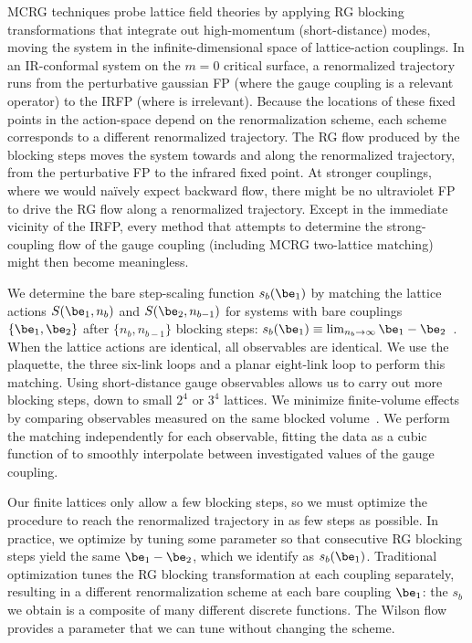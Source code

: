 
MCRG techniques probe lattice field theories by applying RG blocking transformations that integrate out high-momentum (short-distance) modes, moving the system in the infinite-dimensional space of lattice-action couplings.
In an IR-conformal system on the $m = 0$ critical surface, a renormalized trajectory runs from the perturbative gaussian FP (where the gauge coupling \be is a relevant operator) to the IRFP (where \be is irrelevant).
Because the locations of these fixed points in the action-space depend on the renormalization scheme, each scheme corresponds to a different renormalized trajectory.
The RG flow produced by the blocking steps moves the system towards and along the renormalized trajectory, from the perturbative FP to the infrared fixed point.
At stronger couplings, where we would na\"ively expect backward flow, there might be no ultraviolet FP to drive the RG flow along a renormalized trajectory.
Except in the immediate vicinity of the IRFP, every method that attempts to determine the strong-coupling flow of the gauge coupling (including MCRG two-lattice matching) might then become meaningless.

We determine the bare step-scaling function $s_b(\be_1)$ by matching the lattice actions $S(\be_1, n_b)$ and $S(\be_2, n_{b - 1})$ for systems with bare couplings $\{\be_1, \be_2\}$ after $\{n_b, n_{b - 1}\}$ blocking steps: $s_b(\be_1) \equiv \lim_{n_b \to \infty} \be_1 - \be_2$~\cite{Petropoulos:2012mg}.
When the lattice actions are identical, all observables are identical.
We use the plaquette, the three six-link loops and a planar eight-link loop to perform this matching.
Using short-distance gauge observables allows us to carry out more blocking steps, down to small $2^4$ or $3^4$ lattices.
We minimize finite-volume effects by comparing observables measured on the same blocked volume~\cite{Hasenfratz:2011xn}.
We perform the matching independently for each observable, fitting the data as a cubic function of \be to smoothly interpolate between investigated values of the gauge coupling.

Our finite lattices only allow a few blocking steps, so we must optimize the procedure to reach the renormalized trajectory in as few steps as possible.
In practice, we optimize by tuning some parameter so that consecutive RG blocking steps yield the same $\be_1 - \be_2$, which we identify as $s_b(\be_1)$.
Traditional optimization tunes the RG blocking transformation at each coupling separately, resulting in a different renormalization scheme at each bare coupling $\be_1$: the $s_b$ we obtain is a composite of many different discrete \be functions.
The Wilson flow provides a parameter that we can tune without changing the scheme.
